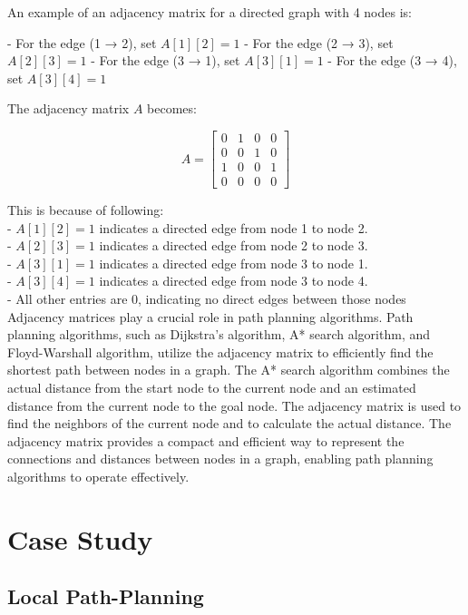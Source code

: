 \documentclass[12pt]{article}
\begin{document}
An example of an adjacency matrix for a directed graph with 4 nodes is:

  - For the edge (1 → 2), set \( A[1][2] = 1 \)
   - For the edge (2 → 3), set \( A[2][3] = 1 \)
   - For the edge (3 → 1), set \( A[3][1] = 1 \)
   - For the edge (3 → 4), set \( A[3][4] = 1 \)

   The adjacency matrix \( A \) becomes:

   \[
   A = \begin{bmatrix}
   0 & 1 & 0 & 0 \\
   0 & 0 & 1 & 0 \\
   1 & 0 & 0 & 1 \\
   0 & 0 & 0 & 0
   \end{bmatrix}
   \]

This is because of following:\\
- \( A[1][2] = 1 \) indicates a directed edge from node 1 to node 2.\\
- \( A[2][3] = 1 \) indicates a directed edge from node 2 to node 3.\\
- \( A[3][1] = 1 \) indicates a directed edge from node 3 to node 1.\\
- \( A[3][4] = 1 \) indicates a directed edge from node 3 to node 4.\\
- All other entries are 0, indicating no direct edges between those nodes\\
Adjacency matrices play a crucial role in path planning algorithms. Path planning algorithms, such as Dijkstra's algorithm, A* search algorithm, and Floyd-Warshall algorithm, utilize the adjacency matrix to efficiently find the shortest path between nodes in a graph. The A* search algorithm combines the actual distance from the start node to the current node and an estimated distance from the current node to the goal node. The adjacency matrix is used to find the neighbors of the current node and to calculate the actual distance. The adjacency matrix provides a compact and efficient way to represent the connections and distances between nodes in a graph, enabling path planning algorithms to operate effectively. 


\newpage 
\section{Case Study}
\subsection{Local Path-Planning}
\end{document}
